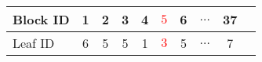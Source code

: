 \begin{tabular}{ l | *{9}{c} } %
	
		Block ID	& 1	& 2	& 3	& 4	& \textcolor{red}{$5$}	& 6	& $\ldots$	& 37	\\
	
		\midrule%
	
		Leaf ID		& 6	& 5	& 5	& 1	& \textcolor{red}{$3$}	& 5	& $\ldots$	& 7		\\
	
\end{tabular}
